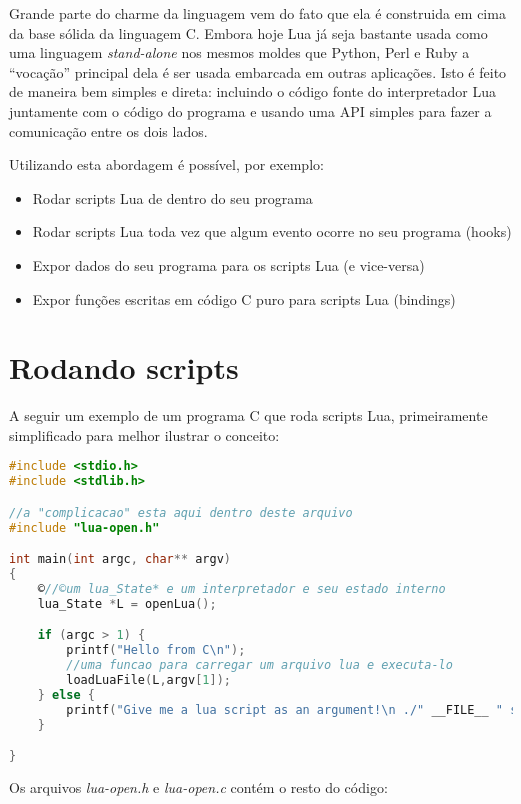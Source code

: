 \documentclass[a4paper,12pt]{abnt}
\begin{document}
Grande parte do charme da linguagem vem do fato
que ela é construida em cima da base sólida da linguagem C.
Embora hoje Lua já seja bastante usada como uma
linguagem \emph{stand-alone} nos mesmos
moldes que Python, Perl e Ruby a ``{}vocação''{} principal dela é
ser usada embarcada em outras aplicações.
Isto é feito de maneira bem simples e direta: incluindo o
código fonte do interpretador Lua juntamente
com o código do programa e usando uma API simples para
fazer a comunicação entre os dois lados.

Utilizando esta abordagem é possível, por exemplo:

\begin{itemize}%
\item Rodar scripts Lua de dentro do seu programa
\item Rodar scripts Lua toda vez que algum evento ocorre no seu programa (hooks)
\item Expor dados do seu programa para os scripts Lua (e vice-versa)
\item Expor funções escritas em código C puro para scripts Lua (bindings)

\end{itemize}

\section{Rodando scripts}

A seguir um exemplo de um programa C que roda scripts Lua,
primeiramente simplificado para melhor ilustrar o conceito:

\begin{lstlisting}[language=C]
#include <stdio.h>
#include <stdlib.h>

//a "complicacao" esta aqui dentro deste arquivo
#include "lua-open.h"

int main(int argc, char** argv)
{
    ©//©um lua_State* e um interpretador e seu estado interno
    lua_State *L = openLua();

    if (argc > 1) {
	    printf("Hello from C\n");
	    //uma funcao para carregar um arquivo lua e executa-lo
	    loadLuaFile(L,argv[1]);
    } else {
	    printf("Give me a lua script as an argument!\n ./" __FILE__ " something.lua\n");
    }

}\end{lstlisting}

Os arquivos \emph{lua-open.h} e \emph{lua-open.c} contém o resto do código:
\end{document}
